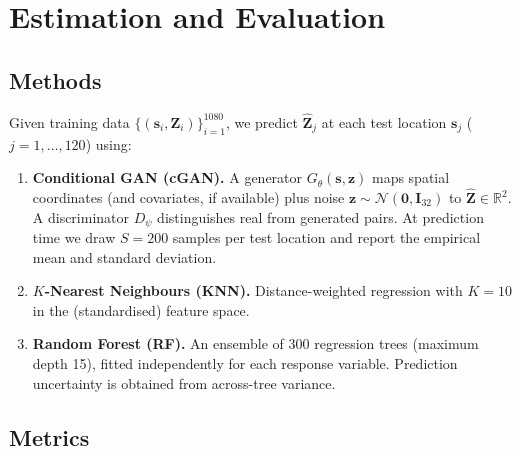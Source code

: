 \documentclass[11pt,a4paper]{article}
\newcommand{\R}{\mathbb{R}}
\newcommand{\bs}{\bm{s}}
\begin{document}
\section{Estimation and Evaluation}

\subsection{Methods}

Given training data $\{(\bs_i,\bm{Z}_i)\}_{i=1}^{1080}$, we predict
$\hat{\bm{Z}}_j$ at each test location $\bs_j$ ($j=1,\dots,120$) using:

\begin{enumerate}[leftmargin=*]
  \item \textbf{Conditional GAN (cGAN).}
    A generator $G_\theta(\bs,\bm{z})$ maps spatial coordinates (and
    covariates, if available) plus noise $\bm{z}\sim\mathcal{N}(\bm{0},\bm{I}_{32})$
    to $\hat{\bm{Z}}\in\R^2$.  A discriminator $D_\psi$ distinguishes real
    from generated pairs.  At prediction time we draw $S=200$ samples per
    test location and report the empirical mean and standard deviation.

  \item \textbf{$K$-Nearest Neighbours (KNN).}
    Distance-weighted regression with $K=10$ in the (standardised)
    feature space.

  \item \textbf{Random Forest (RF).}
    An ensemble of 300 regression trees (maximum depth 15), fitted
    independently for each response variable.  Prediction uncertainty is
    obtained from across-tree variance.
\end{enumerate}

\subsection{Metrics}
\end{document}
